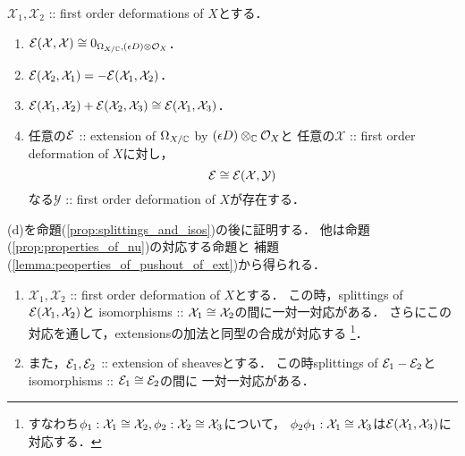 \documentclass[a4paper]{jsarticle}
\newcommand{\defX}{\mathcal{X}}
\newcommand{\defY}{\mathcal{Y}}
\begin{document}
    \begin{Prop}\label{prop:key1}
        $\defX_1, \defX_2$ :: first order deformations of $X$とする．
        \begin{enumerate}[label=(\alph*), leftmargin=*]
        \item
            $\shE(\defX, \defX) \iso 0_{\shDer_{X/ \C}, (\epsilon D) \otimes \shO_X}$．
        \item
            $\shE(\defX_2, \defX_1)=-\shE(\defX_1, \defX_2)$．
        \item 
            $\shE(\defX_1, \defX_2)+\shE(\defX_2, \defX_3) \iso \shE(\defX_1, \defX_3)$．

        \item
            任意の$\mathcal{E}$ :: extension of $\Omega_{X/\mathbb{C}}$ by $(\epsilon D) \otimes_{\mathbb{C}} \mathcal{O}_{X}$と
            任意の$\defX$ :: first order deformation of $X$に対し，
            \[ \shE \iso \shE(\defX, \defY) \]
            なる$\defY$ :: first order deformation of $X$が存在する．
        \end{enumerate}
    \end{Prop}
    (d)を命題(\ref{prop:splittings_and_isos})の後に証明する．
    他は命題(\ref{prop:properties_of_nu})の対応する命題と
    補題(\ref{lemma:peoperties_of_pushout_of_ext})から得られる．

    \begin{Prop} \label{prop:splittings_and_isos} \label{prop:key2}
    \begin{enumerate}[label=(\alph*), leftmargin=*]
    \item 
        $\defX_1, \defX_2$ :: first order deformation of $X$とする．
        この時，splittings of $\shE(\defX_1, \defX_2)$と
        isomorphisms :: $\defX_1 \iso \defX_2$の間に一対一対応がある．
        さらにこの対応を通して，extensionsの加法と同型の合成が対応する
        \footnote
        {
            すなわち$\phi_1: \defX_1 \iso \defX_2, \phi_2: \defX_2 \iso \defX_3$について，
            $\phi_2 \phi_1: \defX_1 \iso \defX_3$は$\shE(\defX_1, \defX_3)$に対応する．
        }．

    \item
        また，$\mathcal{E}_1, \mathcal{E}_2$ :: extension of sheavesとする．
        この時splittings of $\mathcal{E}_1-\mathcal{E}_2$とisomorphisms :: $\mathcal{E}_1 \cong \mathcal{E}_2$の間に
        一対一対応がある．
    \end{enumerate}
    \end{Prop}
\end{document}
